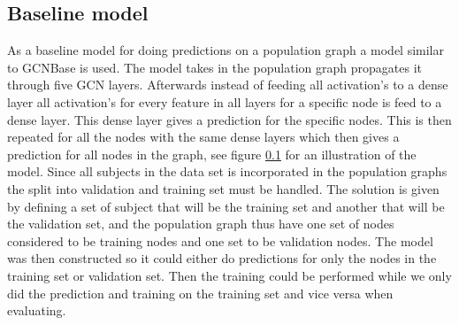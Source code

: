 \subsection{Baseline model}
As a baseline model for doing predictions on a population graph a model similar to GCNBase is used. The model takes in the population graph propagates it through five GCN layers. 
Afterwards instead of feeding all activation's to a dense layer all activation's for every feature in all layers for a specific node is feed to a dense layer. This dense layer gives a prediction for the specific nodes. This is then repeated for all the nodes with the same dense layers which then gives a prediction for all nodes in the graph, see figure \ref{} for an illustration of the model. 
Since all subjects in the data set is incorporated in the population graphs the split into validation and training set must be handled. The solution is given by defining a set of subject that will be the training set and another that will be the validation set, and the population graph thus have one set of nodes considered to be training nodes and one set to be validation nodes. The model was then constructed so it could either do predictions for only the nodes in the training set or validation set. Then the training could be performed while we only did the prediction and training on the training set and vice versa when evaluating.


